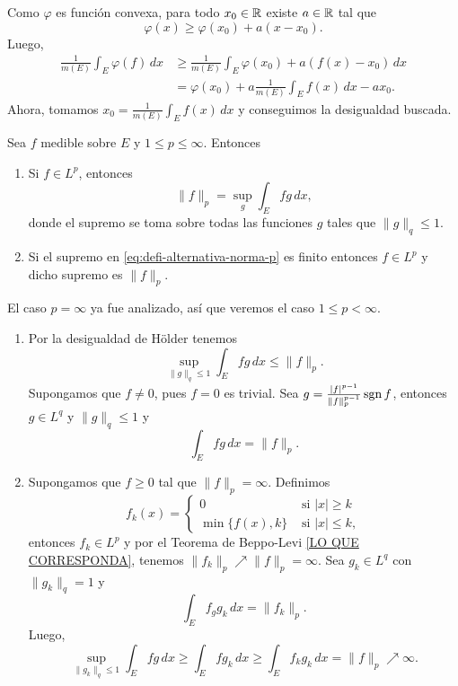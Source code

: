 \begin{demo}
Como $\varphi$ es funci\'on convexa, para todo $x_0\in \mathbb{R}$ existe $a\in \mathbb{R}$ tal que 
\[
\varphi(x)\geq \varphi(x_0)+a(x-x_0).
\]
Luego,
\[
\begin{split}
\frac{1}{m(E)} \int_E \varphi(f)\,dx &\geq 
\frac{1}{m(E)}\int_E \varphi(x_0)+a(f(x)-x_0)\,dx
\\
&=\varphi(x_0)+a\frac{1}{m(E)}\int_E f(x)\,dx -ax_0.
\end{split}
\]
Ahora, tomamos $x_0=\frac{1}{m(E)} \int_E f(x)\,dx$ y  conseguimos la desigualdad buscada.
\end{demo}

\begin{teorema}{}
Sea $f$ medible sobre $E$ y $1\leq p\leq \infty$.
Entonces
\begin{enumerate}
    \item Si $f \in L^p$, entonces 
   \begin{equation}\label{eq:defi-alternativa-norma-p}
        \|f \|_p=\sup\limits_{g} \int_E fg\, dx,
   \end{equation}
   donde el supremo se toma sobre todas las funciones $g$ tales que
   $\|g\|_q\leq 1$.
   \item Si el supremo en \eqref{eq:defi-alternativa-norma-p} es finito entonces  $f \in L^p$ y dicho supremo es $\|f \|_p$.
   \end{enumerate}
\end{teorema}

\begin{demo}
El caso $p=\infty$ ya fue analizado, as\'i que veremos el caso $1\leq p<\infty$.
\begin{enumerate}
    \item Por la desigualdad de H\"older tenemos
    \[\sup\limits_{\|g\|_q\leq 1} \int_E fg\,dx \leq \|f\|_p.\]
    Supongamos que $f \neq 0$, pues $f=0$ es trivial.
    Sea $g= \frac{|f|^{p-1}}{\|f\|_p^{p-1}} \operatorname{sgn} f$, entonces
    $g \in L^q$ y $\|g\|_q\leq 1$ y 
    \[ \int_E fg\, dx=\|f\|_p. \]
    \item Supongamos que $f\geq 0$ tal que $\|f\|_p=\infty.$
    Definimos 
    \[
    f_k(x)=\left\{
    \begin{array}{ll}
       0  &    \mbox{ si } |x|\geq k
       \\
    \min\{f(x),k\}     &  \mbox{ si } |x|\leq k,
    \end{array}
    \right.
    \]    
    entonces $f_k \in L^p$ y por el Teorema de Beppo-Levi \ref{LO QUE CORRESPONDA}, tenemos
    $\|f_k\|_p \nearrow \|f\|_p=\infty. $
    Sea  $g_k\in L^q$ con $\|g_k\|_q=1$ y 
    \[
    \int_E f_g g_k\, dx=\|f_k\|_p.
    \] 
    Luego, 
    \[
    \sup\limits_{\|g_k\|_q\leq 1} \int_E fg\,dx \geq 
    \int_E fg_k\,dx \geq \int_E f_k g_k \,dx=\|f\|_p \nearrow\infty.
    \]
        \end{enumerate}
\end{demo}


